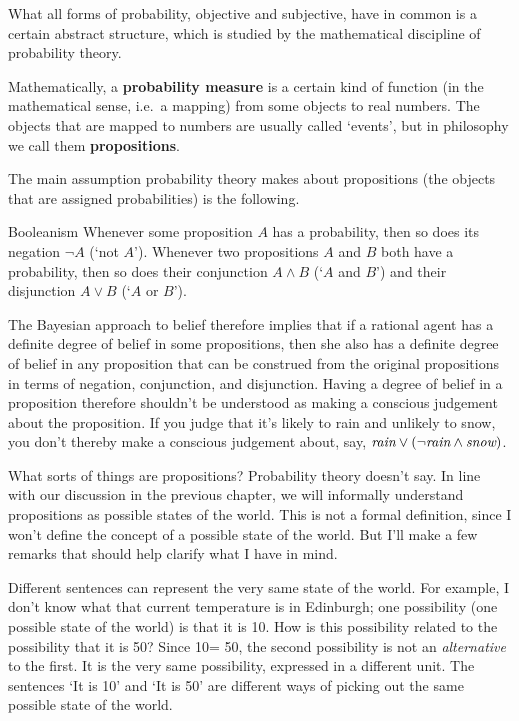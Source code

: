 What all forms of probability, objective and subjective, have in
common is a certain abstract structure, which is studied by the
mathematical discipline of probability theory.

Mathematically, a \textbf{probability measure} is a certain kind of
function (in the mathematical sense, i.e.\ a mapping) from some
objects to real numbers. The objects that are mapped to numbers are
usually called `events', but in philosophy we call them
\textbf{propositions}.

The main assumption probability theory makes about propositions
(the objects that are assigned probabilities) is the following.
%
\begin{genericthm}{Booleanism}
  Whenever some proposition $A$ has a probability, then so does its
  negation $\neg A$ (`not $A$'). Whenever two propositions $A$ and $B$
  both have a probability, then so does their conjunction $A \land B$
  (`$A$ and $B$') and their disjunction $A \lor B$ (`$A$ or $B$').
\end{genericthm}
%
The Bayesian approach to belief therefore implies that if a rational
agent has a definite degree of belief in some propositions, then she
also has a definite degree of belief in any proposition that can be
construed from the original propositions in terms of negation,
conjunction, and disjunction. Having a degree of belief in a
proposition therefore shouldn't be understood as making a conscious
judgement about the proposition. If you judge that it's likely to rain
and unlikely to snow, you don't thereby make a conscious judgement
about, say, $\emph{rain} \lor (\neg \emph{rain} \land \emph{snow})$.

What sorts of things are propositions? Probability theory doesn't say.
In line with our discussion in the previous chapter, we will
informally understand propositions as possible states of the world.
This is not a formal definition, since I won't define the concept
of a possible state of the world. But I'll make a few remarks
that should help clarify what I have in mind.

Different sentences can represent the very same state of the world.
For example, I don't know what that current temperature is in
Edinburgh; one possibility (one possible state of the world) is that
it is 10\celsius. How is this possibility related to the possibility
that it is 50\fahrenheit? Since 10\celsius = 50\fahrenheit, the second
possibility is not an \emph{alternative} to the first. It is the very
same possibility, expressed in a different unit. The sentences `It is
10\celsius' and `It is 50\fahrenheit' are different ways of picking
out the same possible state of the world.


